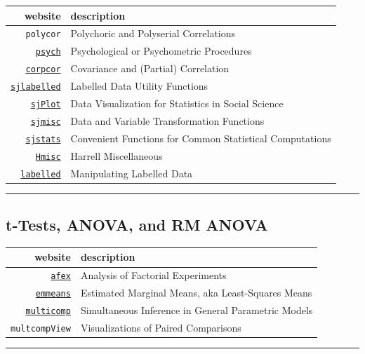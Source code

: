 \documentclass[]{book}
\theoremstyle{definition}
\theoremstyle{definition}
\theoremstyle{definition}
\theoremstyle{remark}
\begin{document}
\begin{longtable}[]{@{}rl@{}}
\toprule
website & description\tabularnewline
\midrule
\endhead
\texttt{polycor} & Polychoric and Polyserial Correlations\tabularnewline
\href{http://personality-project.org/r/psych/}{\texttt{psych}} &
Psychological or Psychometric Procedures\tabularnewline
\href{http://strimmerlab.org/software/corpcor/}{\texttt{corpcor}} &
Covariance and (Partial) Correlation\tabularnewline
\href{https://strengejacke.github.io/sjlabelled/}{\texttt{sjlabelled}} &
Labelled Data Utility Functions\tabularnewline
\href{http://www.strengejacke.de/sjPlot/}{\texttt{sjPlot}} & Data
Visualization for Statistics in Social Science\tabularnewline
\href{http://www.strengejacke.de/sjmisc/}{\texttt{sjmisc}} & Data and
Variable Transformation Functions\tabularnewline
\href{http://www.strengejacke.de/sjstats/}{\texttt{sjstats}} &
Convenient Functions for Common Statistical Computations\tabularnewline
\href{http://biostat.mc.vanderbilt.edu/wiki/Main/Hmisc}{\texttt{Hmisc}}
& Harrell Miscellaneous\tabularnewline
\href{https://github.com/larmarange/labelled}{\texttt{labelled}} &
Manipulating Labelled Data\tabularnewline
\bottomrule
\end{longtable}

\begin{center}\rule{0.5\linewidth}{\linethickness}\end{center}

\subsection{t-Tests, ANOVA, and RM
ANOVA}\label{t-tests-anova-and-rm-anova}

\begin{longtable}[]{@{}rl@{}}
\toprule
website & description\tabularnewline
\midrule
\endhead
\href{https://github.com/singmann/afex}{\texttt{afex}} & Analysis of
Factorial Experiments\tabularnewline
\href{https://github.com/rvlenth/emmeans}{\texttt{emmeans}} & Estimated
Marginal Means, aka Least-Squares Means\tabularnewline
\href{http://multcomp.r-forge.r-project.org/}{\texttt{multicomp}} &
Simultaneous Inference in General Parametric Models\tabularnewline
\texttt{multcompView} & Visualizations of Paired
Comparisons\tabularnewline
\bottomrule
\end{longtable}

\begin{center}\rule{0.5\linewidth}{\linethickness}\end{center}
\end{document}
